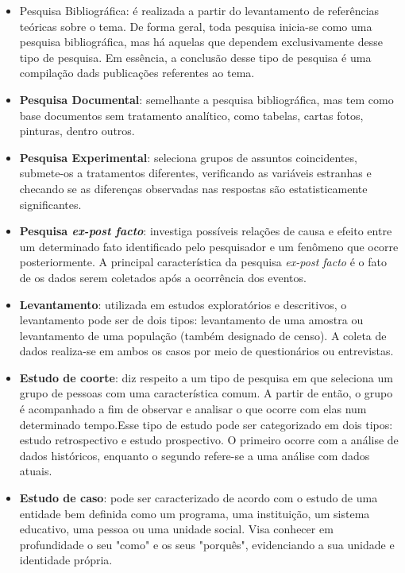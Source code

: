 \begin{itemize}
\item Pesquisa Bibliográfica: é realizada a partir do levantamento de referências teóricas sobre o tema. De forma geral, toda pesquisa inicia-se como uma pesquisa bibliográfica, mas há aquelas que dependem exclusivamente desse tipo de pesquisa. Em essência, a conclusão desse tipo de pesquisa é uma compilação dads publicações referentes ao tema. 

\item \textbf{Pesquisa Documental}: semelhante a pesquisa bibliográfica, mas tem como base documentos sem tratamento analítico, como tabelas, cartas fotos, pinturas, dentro outros. 

\item \textbf{Pesquisa Experimental}: seleciona grupos de assuntos coincidentes, submete-os a tratamentos diferentes, verificando as variáveis estranhas e checando se as diferenças observadas nas respostas são estatisticamente significantes.

\item \textbf{Pesquisa \textit{ex-post facto}}: investiga possíveis relações de causa e efeito entre um determinado fato identificado pelo pesquisador e um fenômeno que ocorre posteriormente. A principal característica da pesquisa \textit{ex-post facto} é o fato de os dados serem coletados após a ocorrência dos eventos.

\item \textbf{Levantamento}: utilizada em estudos exploratórios e descritivos, o levantamento pode ser de dois tipos: levantamento de uma amostra ou levantamento de uma população (também designado de censo). A coleta de dados realiza-se em ambos os casos por meio de questionários ou entrevistas.

\item \textbf{Estudo de coorte}: diz respeito a um tipo de pesquisa em que seleciona um grupo de pessoas com uma característica comum. A partir de então, o grupo é acompanhado a fim de observar e analisar o que ocorre com elas num determinado tempo.Esse tipo de estudo pode ser categorizado em dois tipos: estudo retrospectivo e estudo prospectivo. O primeiro ocorre com a análise de dados históricos, enquanto o segundo refere-se a uma análise com dados atuais.   

\item \textbf{Estudo de caso}: pode ser caracterizado de acordo com o estudo de uma entidade bem definida como um programa, uma instituição, um sistema educativo, uma pessoa ou uma unidade social. Visa conhecer em profundidade o seu "como" e os seus "porquês", evidenciando a sua unidade e identidade própria. 


\end{itemize}
